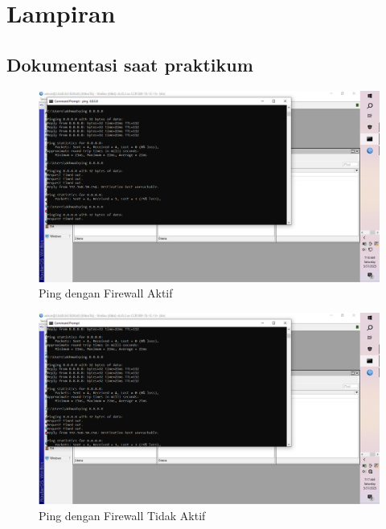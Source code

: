 \section{Lampiran}
\subsection{Dokumentasi saat praktikum}
    \begin{figure}[H]
        \centering
        \includegraphics[width=0.5\linewidth]{gambar8a.jpeg}
        \caption{Ping dengan Firewall Aktif}
        \label{fig:ping-saat-firewall-aktif}
    \end{figure}

    \begin{figure}[H]
        \centering
        \includegraphics[width=0.5\linewidth]{gambar8b.jpeg}
        \caption{Ping dengan Firewall Tidak Aktif}
        \label{fig:ping-saat-firewall-tidak-aktif}
    \end{figure}


